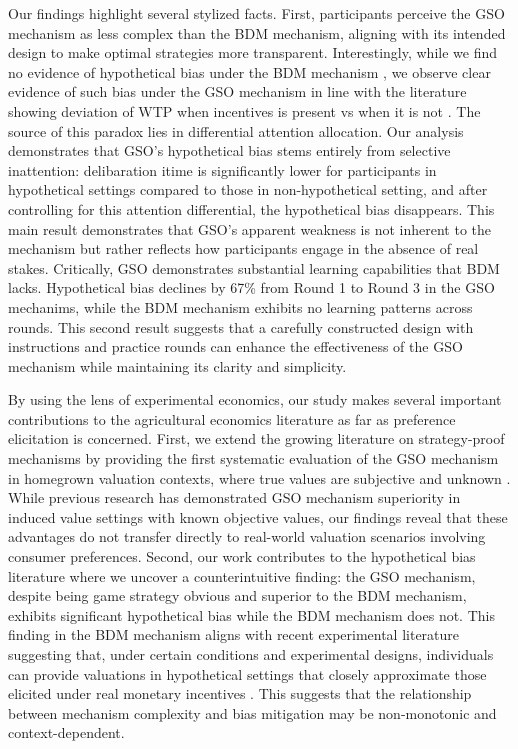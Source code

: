 \documentclass[12pt]{article}
\begin{document}
Our findings highlight several stylized facts. First, participants perceive the GSO mechanism as less complex than the BDM mechanism, aligning with its intended design to make optimal strategies more transparent. Interestingly, while we find no evidence of hypothetical bias under the BDM mechanism \citep{branas-garza_paid_2023, drichoutis_incentives_2025}, we observe clear evidence of such bias under the GSO mechanism in line with the literature showing deviation of WTP when incentives is present vs when it is not \citep{loomis_whats_2011, penn2018understanding}. 
The source of this paradox lies in differential attention allocation. Our analysis demonstrates that GSO's hypothetical bias stems entirely from selective inattention: delibaration itime is significantly lower for participants in hypothetical settings compared to those in non-hypothetical setting, and after controlling for this attention differential, the hypothetical bias disappears. This main result demonstrates that GSO's apparent weakness is not inherent to the mechanism but rather reflects how participants engage in the absence of real stakes. Critically, GSO demonstrates substantial learning capabilities that BDM lacks. Hypothetical bias declines by 67\% from Round 1 to Round 3 in the GSO mechanims, while the BDM mechanism exhibits no learning patterns across rounds. This second result suggests that a carefully constructed design with instructions and practice rounds can enhance the effectiveness of the GSO mechanism while maintaining its clarity and simplicity.


By using the lens of experimental economics, our study makes several important contributions to the  agricultural economics literature as far as preference elicitation is concerned. First, we extend the growing literature on strategy-proof mechanisms by providing the first systematic evaluation of the GSO mechanism in homegrown valuation contexts, where true values are subjective and unknown \citep{li_obviously_2017, pycia_theory_2023, chakraborty_future_2025}. While previous research has demonstrated GSO mechanism superiority in induced value settings with known objective values, our findings reveal that these advantages do not transfer directly to real-world valuation scenarios involving consumer preferences. Second, our work contributes to the hypothetical bias literature \citep{penn2018understanding, cummings1999unbiased, loomis_whats_2011, fang_use_2021, list2001explicit, grebitus2013explaining} where we uncover a counterintuitive finding: the GSO mechanism, despite being game strategy obvious and superior to the BDM mechanism, exhibits significant hypothetical bias while the BDM mechanism does not. This finding in the BDM mechanism aligns with recent experimental literature suggesting that, under certain conditions and experimental designs, individuals can provide valuations in hypothetical settings that closely approximate those elicited under real monetary incentives \citep{branas-garza_paid_2023, drichoutis_incentives_2025, hackethal2023role}. This suggests that the relationship between mechanism complexity and bias mitigation may be non-monotonic and context-dependent.
\end{document}
